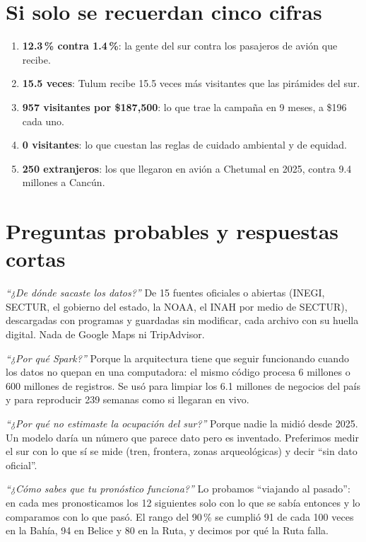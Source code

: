\section{Si solo se recuerdan cinco cifras}
\begin{enumerate}
\item \textbf{12.3\,\% contra 1.4\,\%}: la gente del sur contra los pasajeros de avión que recibe.
\item \textbf{15.5 veces}: Tulum recibe 15.5 veces más visitantes que las pirámides del sur.
\item \textbf{957 visitantes por \$187,500}: lo que trae la campaña en 9 meses, a \$196 cada uno.
\item \textbf{0 visitantes}: lo que cuestan las reglas de cuidado ambiental y de equidad.
\item \textbf{250 extranjeros}: los que llegaron en avión a Chetumal en 2025, contra 9.4 millones a Cancún.
\end{enumerate}

\section{Preguntas probables y respuestas cortas}
\begin{teprofe}
\emph{``¿De dónde sacaste los datos?''} De 15 fuentes oficiales o abiertas (INEGI, SECTUR, el gobierno del estado, la NOAA,
el INAH por medio de SECTUR), descargadas con programas y guardadas sin modificar, cada archivo con su huella digital. Nada
de Google Maps ni TripAdvisor.
\end{teprofe}

\begin{teprofe}
\emph{``¿Por qué Spark?''} Porque la arquitectura tiene que seguir funcionando cuando los datos no quepan en una computadora:
el mismo código procesa 6 millones o 600 millones de registros. Se usó para limpiar los 6.1 millones de negocios del país y
para reproducir 239 semanas como si llegaran en vivo.
\end{teprofe}

\begin{teprofe}
\emph{``¿Por qué no estimaste la ocupación del sur?''} Porque nadie la midió desde 2025. Un modelo daría un número que parece
dato pero es inventado. Preferimos medir el sur con lo que sí se mide (tren, frontera, zonas arqueológicas) y decir ``sin
dato oficial''.
\end{teprofe}

\begin{teprofe}
\emph{``¿Cómo sabes que tu pronóstico funciona?''} Lo probamos ``viajando al pasado'': en cada mes pronosticamos los 12
siguientes solo con lo que se sabía entonces y lo comparamos con lo que pasó. El rango del 90\,\% se cumplió 91 de cada 100
veces en la Bahía, 94 en Belice y 80 en la Ruta, y decimos por qué la Ruta falla.
\end{teprofe}

